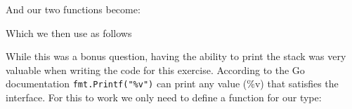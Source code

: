 \begin{Answer}
\noindent{}And our two functions become:

Which we then use as follows


\Question While this was a bonus question, having the ability to print
the stack was very valuable when writing the code for this exercise.
According to the Go documentation \lstinline{fmt.Printf("%v")} can
print any value (\%v) that satisfies the  interface.
For this to work we only need to define a  function for
our type:

\end{Answer}
